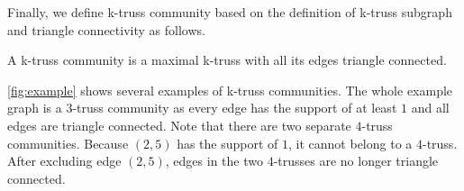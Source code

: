 
Finally, we define k-truss community based on the definition of k-truss subgraph and triangle connectivity as follows.

\begin{Def} 
A k-truss community is a maximal k-truss with all its edges triangle connected.
\label{def:k-truss_community}
\end{Def}

\autoref{fig:example} shows several examples of k-truss communities. The whole example graph is a $3$-truss community as every edge has the support of at least $1$ and all edges are triangle connected. Note that there are two separate $4$-truss communities. Because $(2,5)$ has the support of $1$, it cannot belong to a $4$-truss. After excluding edge $(2,5)$, edges in the two $4$-trusses are no longer triangle connected.
